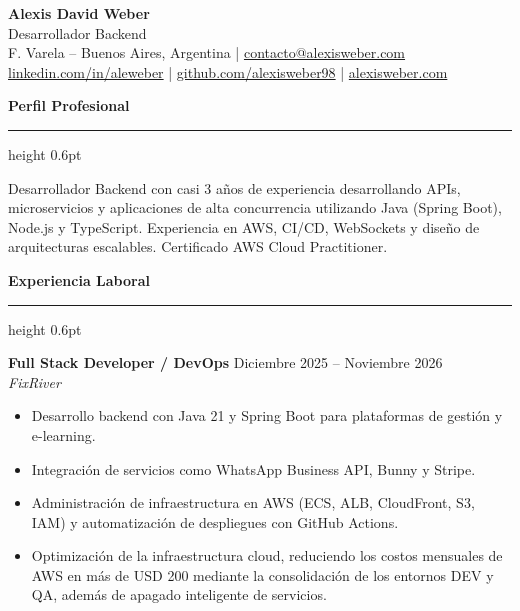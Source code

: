 \documentclass[10pt,a4paper]{article}
\renewcommand{\section}[2]{%
  \par\vspace{7pt}%
  {\large\bfseries\color{accent}#2}\par\vspace{1pt}%
  {\color{accent}\hrule height 0.6pt}\vspace{4pt}%
}
\newcommand{\job}[3]{%
  \textbf{#1} \hfill {\small #3}\\
  \textit{#2}%
}
\begin{document}
\begin{center}
  {\LARGE\bfseries Alexis David Weber}\\[3pt]
  {\large Desarrollador Backend}\\[6pt]
  {\small
    F. Varela -- Buenos Aires, Argentina \quad|\quad
    \href{mailto:contacto@alexisweber.com}{contacto@alexisweber.com}\\[2pt]
    \href{https://linkedin.com/in/aleweber}{linkedin.com/in/aleweber} \quad|\quad
    \href{https://github.com/alexisweber98}{github.com/alexisweber98} \quad|\quad
    \href{https://alexisweber.com}{alexisweber.com}
  }
\end{center}

\section*{Perfil Profesional}
Desarrollador Backend con casi 3 años de experiencia desarrollando APIs,
microservicios y aplicaciones de alta concurrencia utilizando Java (Spring Boot),
Node.js y TypeScript. Experiencia en AWS, CI/CD, WebSockets y diseño de
arquitecturas escalables. Certificado AWS Cloud Practitioner.

\section*{Experiencia Laboral}

\job{Full Stack Developer / DevOps}{FixRiver}{Diciembre 2025 -- Noviembre 2026}
\begin{itemize}
  \item Desarrollo backend con Java 21 y Spring Boot para plataformas de gestión y e-learning.
  \item Integración de servicios como WhatsApp Business API, Bunny y Stripe.
  \item Administración de infraestructura en AWS (ECS, ALB, CloudFront, S3, IAM) y
        automatización de despliegues con GitHub Actions.
  \item Optimización de la infraestructura cloud, reduciendo los costos mensuales de AWS
        en más de USD 200 mediante la consolidación de los entornos DEV y QA, además de
        apagado inteligente de servicios.
\end{itemize}
\end{document}
